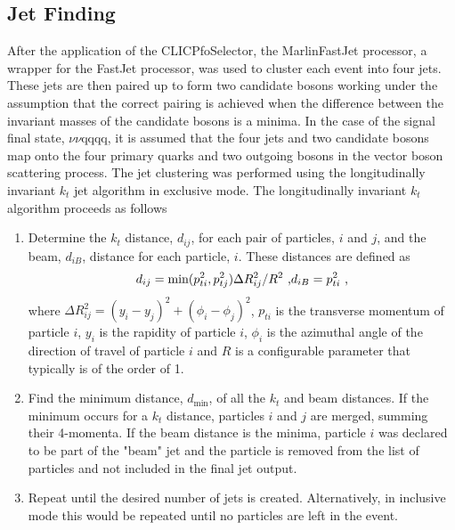 \subsection{Jet Finding} 
\label{sec:jetpairing}
After the application of the CLICPfoSelector, the MarlinFastJet processor, a wrapper for the FastJet \cite{Cacciari:2011ma} processor, was used to cluster each event into four jets.  These jets are then paired up to form two candidate bosons working under the assumption that the correct pairing is achieved when the difference between the invariant masses of the candidate bosons is a minima.  In the case of the signal final state, $\nu\nu$qqqq, it is assumed that the four jets and two candidate bosons map onto the four primary quarks and two outgoing bosons in the vector boson scattering process.  The jet clustering was performed using the longitudinally invariant $k_{t}$ jet algorithm in exclusive mode.  The longitudinally invariant $k_{t}$ algorithm proceeds as follows

\begin{enumerate}
\item Determine the $k_{t}$ distance, $d_{ij}$, for each pair of particles, $i$ and $j$, and the beam, $d_{iB}$, distance for each particle, $i$.  These distances are defined as
\begin{equation}
d_{ij} = \text{min}(p_{ti}^{2}, p_{tj}^{2}){\Delta}R^{2}_{ij}/R^{2} \text{ ,} \\
d_{iB} = p_{ti}^{2} \text{ ,}
\end{equation}
where ${\Delta}R^{2}_{ij} = (y_{i} - y_{j})^2 + (\phi_{i} - \phi_{j})^2$, $p_{ti}$ is the transverse momentum of particle $i$, $y_{i}$ is the rapidity of particle $i$, $\phi_{i}$ is the azimuthal angle of the direction of travel of particle $i$ and $R$ is a configurable parameter that typically is of the order of 1.
\item Find the minimum distance, $d_\text{min}$, of all the $k_{t}$ and beam distances.  If the minimum occurs for a $k_{t}$ distance, particles $i$ and $j$ are merged, summing their 4-momenta.  If the beam distance is the minima, particle $i$ was declared to be part of the "beam" jet and the particle is removed from the list of particles and not included in the final jet output.
\item Repeat until the desired number of jets is created.  Alternatively, in inclusive mode this would be repeated until no particles are left in the event.
\end{enumerate}

